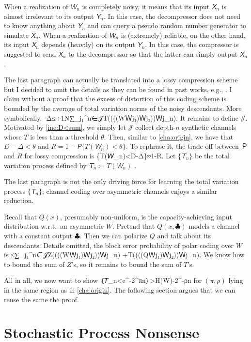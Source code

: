 \documentclass[openany]{amsbook}
\makeatletter
\numberwithin{equation}{chapter}
\numberwithin{figure}{chapter}
\numberwithin{table}{chapter}
\def\bigl@C#1{\bigl#1}					\def\bigr@C#1{\bigr#1}
\def\({\bigl@C(}	\def\){\bigr@C)}	令（{\Bigl(}			令）{\Bigr)}
\def\[#1\]{\begin{equation*}{#1}\end{equation*}}
\theoremstyle{definition}	理dfn:Definition~?s			理exa:Example~?s
\theoremstyle{remark}		理cla:Claim~?s				理rem:Remark~?s
\makeatother
\begin{document}
	When a realization of $𝘞_n$ is completely noisy,
	it means that its input $𝘟_n$ is almost irrelevant to its output $𝘠_n$.
	In this case, the decompressor does not need to know anything about $𝘠_n$
	and can query a pseudo random number generator to simulate $𝘟_n$.
	When a realization of $𝘞_n$ is (extremely) reliable, on the other hand,
	its input $𝘟_n$ depends (heavily) on its output $𝘠_n$.
	In this case, the compressor is suggested to send $𝘟_n$
	to the decompressor so that the latter can simply output $𝘟_n$.
	
	The last paragraph can actually be translated into
	a lossy compression scheme but I decided to omit the details
	as they can be found in past works, e.g., \cite{KU10o}.
	I claim without a proof that the excess of distortion of this coding scheme
	is bounded by the average of total variation norms of the noisy descendants.
	More symbolically,
	\[D-Δ≤÷1N∑_{j₁^n∈𝒥}T\(\(\dotsb((WＷ{j₁})Ｗ{j₂})\dotsb\)Ｗ{j_n}\).
		\label{ine:D<sum}\]
	It remains to define $𝒥$.
	Motivated by \cref{ine:D<sum}, we simply let $𝒥$ collect depth-$n$
	synthetic channels whose $T$ is less than a threshold $θ$.
	Then, similar to \cref{cha:origin}, we have that $D-Δ<θ$ and $R=1-𝘗\{T(𝘞_n)<θ\}$.
	To rephrase it, the trade-off between $Ｐ$ and $R$ for lossy compression is
	\[𝘗\{T(𝘞_n)<D-Δ\}≈1-R.\]
	Let $\{𝘛_n\}$ be the total variation process defined by $𝘛_n≔T(𝘞_n)$ .
	
	The last paragraph is not the only driving force
	for learning the total variation process $\{𝘛_n\}$;
	channel coding over asymmetric channels enjoys a similar reduction.
	
	Recall that $Q(x)$, presumably non-uniform,
	is the capacity-achieving input distribution w.r.t.\ an asymmetric $W$.
	Pretend that $Q(x,♣)$ models a channel with a constant output $♣$.
	Then we can polarize $Q$ and talk about its descendants.
	Details omitted, the block error probability of polar coding over $W$ is \cite{HY13}
	\[Ｐ≤∑_{j₁^n∈𝒥}Z\(\(\dotsb((WＷ{j₁})Ｗ{j₂})\dotsb\)Ｗ{j_n}\)
		+T\(\(\dotsb((QＷ{j₁})Ｗ{j₂})\dotsb\)Ｗ{j_n}\).\label{ine:P<sumsum}\]
	We know how to bound the sum of $Z$'s, so it remains to bound the sum of $T$'s.
	
	All in all, we now want to show
	\[𝘗｛𝘛_n<e^{-2^{πn}}｝>H(W)-2^{-ρn}\label{ine:T-e2pin}\]
	for $(π,ρ)$ lying in the same region as in \cref{cha:origin}.
	The following section argues that we can reuse the same the proof.

\section{Stochastic Process Nonsense}
\end{document}
